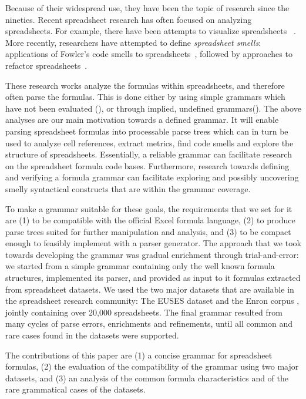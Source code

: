 \documentclass[conference]{IEEEtran}
\begin{document}
Because of their widespread use, they have been the topic of research since the nineties\cite{DBLP:journals/sigplan/BellP93}. Recent spreadsheet research has often focused on analyzing spreadsheets. For example, there have been attempts to visualize spreadsheets ~\cite{DBLP:conf/icse/HermansPD11, Shio1999}. More recently, researchers have attempted to define \emph{spreadsheet smells}: applications of Fowler's code smells to spreadsheets~\cite{DBLP:conf/icse/HermansPD12, DBLP:conf/icsm/Hermans212}, followed by approaches to refactor spreadsheets~\cite{hermans2014bumblebee,badame2012refactoring}.

These research works analyze the formulas within spreadsheets, and therefore often parse the formulas. This is done either by using simple grammars which have not been evaluated (\cite{badame2012refactoring}), or through implied, undefined grammars(\cite{DBLP:conf/icse/HermansPD11,DBLP:conf/icse/HermansPD12, DBLP:conf/icsm/Hermans212, hermans2014bumblebee}). The above analyses are our main motivation towards a defined grammar. It will enable parsing spreadsheet formulas into processable parse trees which can in turn be used to analyze cell references, extract metrics, find code smells and explore the structure of spreadsheets. Essentially, a reliable grammar can facilitate research on the spreadsheet formula code bases. Furthermore, research towards defining and verifying a formula grammar can facilitate exploring and possibly uncovering smelly syntactical constructs that are within the grammar coverage.

To make a grammar suitable for these goals, the requirements that we set for it are (1) to be compatible with the official Excel formula language, (2) to produce parse trees suited for further manipulation and analysis, and (3) to be compact enough to feasibly implement with a parser generator. The approach that we took towards developing the grammar was gradual enrichment through trial-and-error: we started from a simple grammar containing only the well known formula structures, implemented its parser, and provided as input to it formulas extracted from spreadsheet datasets. We used the two major datasets that are available in the spreadsheet research community: The EUSES dataset \cite{euses} and the Enron corpus \cite{enron}, jointly containing over 20,000 spreadsheets. The final grammar resulted from many cycles of parse errors, enrichments and refinements, until all common and rare cases found in the datasets were supported.

The contributions of this paper are (1) a concise grammar for spreadsheet formulas, (2) the evaluation of the compatibility of the grammar using two major datasets, and (3) an analysis of the common formula characteristics and of the rare grammatical cases of the datasets.
\end{document}
